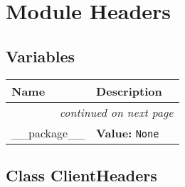 %
%
%


\section{Module Headers}

    \label{Headers}


  \subsection{Variables}

    \vspace{-1cm}
\hspace{\varindent}\begin{longtable}{|p{\varnamewidth}|p{\vardescrwidth}|l}
\cline{1-2}
\cline{1-2} \centering \textbf{Name} & \centering \textbf{Description}& \\
\cline{1-2}
\endhead\cline{1-2}\multicolumn{3}{r}{\small\textit{continued on next page}}\\\endfoot\cline{1-2}
\endlastfoot\raggedright \_\-\_\-p\-a\-c\-k\-a\-g\-e\-\_\-\_\- & \raggedright \textbf{Value:} 
{\tt None}&\\
\cline{1-2}
\end{longtable}



\subsection{Class ClientHeaders}

    \label{Headers:ClientHeaders}

